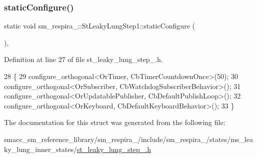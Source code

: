 \subsubsection{\texorpdfstring{static\+Configure()}{staticConfigure()}}
{\footnotesize\ttfamily static void sm\+\_\+respira\+\_\+::\+St\+Leaky\+Lung\+Step1\+::static\+Configure (\begin{DoxyParamCaption}{ }\end{DoxyParamCaption})\hspace{0.3cm}{\ttfamily [inline]}, {\ttfamily [static]}}



Definition at line 27 of file st\+\_\+leaky\+\_\+lung\+\_\+step\+\_.\+h.


\begin{DoxyCode}
28     \{
29         configure\_orthogonal<OrTimer, CbTimerCountdownOnce>(50);
30         configure\_orthogonal<OrSubscriber, CbWatchdogSubscriberBehavior>();
31         configure\_orthogonal<OrUpdatablePublisher, CbDefaultPublishLoop>();
32         configure\_orthogonal<OrKeyboard, CbDefaultKeyboardBehavior>();
33     \}
\end{DoxyCode}


The documentation for this struct was generated from the following file\+:\begin{DoxyCompactItemize}
\item 
smacc\+\_\+sm\+\_\+reference\+\_\+library/sm\+\_\+respira\+\_/include/sm\+\_\+respira\+\_/states/ms\+\_\+leaky\+\_\+lung\+\_\+inner\+\_\+states/\hyperlink{st__leaky__lung__step__1_8h}{st\+\_\+leaky\+\_\+lung\+\_\+step\+\_.\+h}\end{DoxyCompactItemize}
